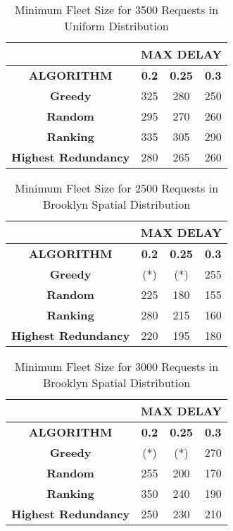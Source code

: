 \documentclass[urop]{socreport}
\begin{document}
\begin{table}[h!]
    \centering
    \begin{tabular}{|c|c|c|c|}
        \hline
         & \multicolumn{3}{|c|}{\textbf{MAX DELAY}}\\
         \hline
         \textbf{ALGORITHM} & \textbf{0.2} & \textbf{0.25}& \textbf{0.3}\\
         \hline \hline
         \textbf{Greedy} & 325 & 280 & 250\\
         \hline
         \textbf{Random} & 295 & 270& 260\\
         \hline
         \textbf{Ranking} & 335 & 305 & 290\\
         \hline
         \textbf{Highest Redundancy} & 280 & 265 & 260\\
        \hline
    \end{tabular}
    \caption{Minimum Fleet Size for 3500 Requests in Uniform Distribution}
    \label{tab:exp3_unif3500}
\end{table}


\begin{table}[h!]
    \centering
    \begin{tabular}{|c|c|c|c|}
        \hline
         & \multicolumn{3}{|c|}{\textbf{MAX DELAY}}\\
         \hline
         \textbf{ALGORITHM} & \textbf{0.2} & \textbf{0.25}& \textbf{0.3}\\
         \hline \hline
         \textbf{Greedy} & (*) & (*) & 255\\
         \hline
         \textbf{Random} & 225 & 180& 155\\
         \hline
         \textbf{Ranking} & 280 & 215 & 160\\
         \hline
         \textbf{Highest Redundancy} & 220 & 195 & 180\\
        \hline
    \end{tabular}
    \caption{Minimum Fleet Size for 2500 Requests in Brooklyn Spatial Distribution}
    \label{tab:exp3_peaks2500}
\end{table}

\begin{table}[h!]
    \centering
    \begin{tabular}{|c|c|c|c|}
        \hline
         & \multicolumn{3}{|c|}{\textbf{MAX DELAY}}\\
         \hline
         \textbf{ALGORITHM} & \textbf{0.2} & \textbf{0.25}& \textbf{0.3}\\
         \hline \hline
         \textbf{Greedy} & (*) & (*) & 270\\
         \hline
         \textbf{Random} & 255 & 200& 170\\
         \hline
         \textbf{Ranking} & 350 & 240 & 190\\
         \hline
         \textbf{Highest Redundancy} & 250 & 230 & 210\\
        \hline
    \end{tabular}
    \caption{Minimum Fleet Size for 3000 Requests in Brooklyn Spatial Distribution}
    \label{tab:exp3_peaks3000}
\end{table}
\end{document}
